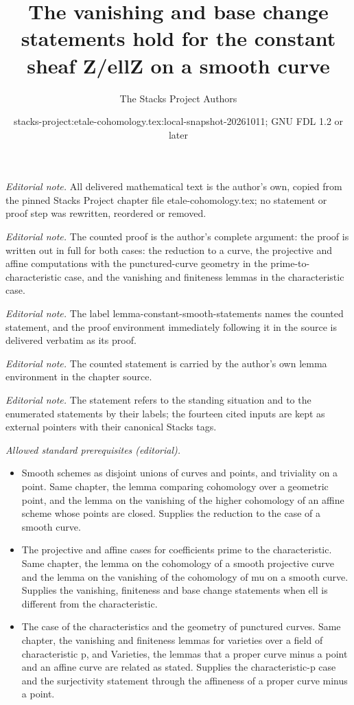 \documentclass[10pt,a4paper]{amsart}
\title{The vanishing and base change statements hold for the constant sheaf Z/ellZ on a smooth curve}
\author{The Stacks Project Authors}
\date{stacks-project:etale-cohomology.tex:local-snapshot-20261011; GNU FDL 1.2 or later}
\theoremstyle{plain}
\theoremstyle{definition}
\theoremstyle{remark}
\numberwithin{equation}{subsection}
\begin{document}
\maketitle
\noindent\textit{Editorial note.} All delivered mathematical text is the author's own, copied from the pinned Stacks Project chapter file etale-cohomology.tex; no statement or proof step was rewritten, reordered or removed.\par\medskip
\noindent\textit{Editorial note.} The counted proof is the author's complete argument: the proof is written out in full for both cases: the reduction to a curve, the projective and affine computations with the punctured-curve geometry in the prime-to-characteristic case, and the vanishing and finiteness lemmas in the characteristic case.\par\medskip
\noindent\textit{Editorial note.} The label lemma-constant-smooth-statements names the counted statement, and the proof environment immediately following it in the source is delivered verbatim as its proof.\par\medskip
\noindent\textit{Editorial note.} The counted statement is carried by the author's own lemma environment in the chapter source.\par\medskip
\noindent\textit{Editorial note.} The statement refers to the standing situation and to the enumerated statements by their labels; the fourteen cited inputs are kept as external pointers with their canonical Stacks tags.\par\medskip
\noindent\textit{Allowed standard prerequisites (editorial).}\begin{itemize}
\item Smooth schemes as disjoint unions of curves and points, and triviality on a point. Same chapter, the lemma comparing cohomology over a geometric point, and the lemma on the vanishing of the higher cohomology of an affine scheme whose points are closed. Supplies the reduction to the case of a smooth curve.
\item The projective and affine cases for coefficients prime to the characteristic. Same chapter, the lemma on the cohomology of a smooth projective curve and the lemma on the vanishing of the cohomology of mu on a smooth curve. Supplies the vanishing, finiteness and base change statements when ell is different from the characteristic.
\item The case of the characteristics and the geometry of punctured curves. Same chapter, the vanishing and finiteness lemmas for varieties over a field of characteristic p, and Varieties, the lemmas that a proper curve minus a point and an affine curve are related as stated. Supplies the characteristic-p case and the surjectivity statement through the affineness of a proper curve minus a point.
\end{itemize}\medskip
\end{document}
